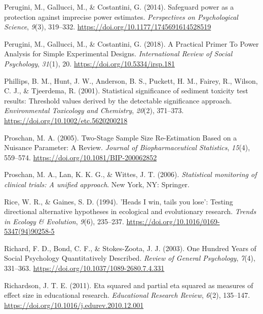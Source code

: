 \documentclass[
  english,
  ,jou, a4paper,floatsintext]{apa6}
\newlength{\cslhangindent}
\newenvironment{cslreferences}%
  {\setlength{\parindent}{0pt}%
  \everypar{\setlength{\hangindent}{\cslhangindent}}\ignorespaces}%
  {\par}
\begin{document}
\begin{cslreferences}
\leavevmode\hypertarget{ref-perugini_safeguard_2014}{}%
Perugini, M., Gallucci, M., \& Costantini, G. (2014). Safeguard power as a protection against imprecise power estimates. \emph{Perspectives on Psychological Science}, \emph{9}(3), 319--332. \url{https://doi.org/10.1177/1745691614528519}

\leavevmode\hypertarget{ref-perugini_practical_2018}{}%
Perugini, M., Gallucci, M., \& Costantini, G. (2018). A Practical Primer To Power Analysis for Simple Experimental Designs. \emph{International Review of Social Psychology}, \emph{31}(1), 20. \url{https://doi.org/10.5334/irsp.181}

\leavevmode\hypertarget{ref-phillips_statistical_2001}{}%
Phillips, B. M., Hunt, J. W., Anderson, B. S., Puckett, H. M., Fairey, R., Wilson, C. J., \& Tjeerdema, R. (2001). Statistical significance of sediment toxicity test results: Threshold values derived by the detectable significance approach. \emph{Environmental Toxicology and Chemistry}, \emph{20}(2), 371--373. \url{https://doi.org/10.1002/etc.5620200218}

\leavevmode\hypertarget{ref-proschan_two-stage_2005}{}%
Proschan, M. A. (2005). Two-Stage Sample Size Re-Estimation Based on a Nuisance Parameter: A Review. \emph{Journal of Biopharmaceutical Statistics}, \emph{15}(4), 559--574. \url{https://doi.org/10.1081/BIP-200062852}

\leavevmode\hypertarget{ref-proschan_statistical_2006}{}%
Proschan, M. A., Lan, K. K. G., \& Wittes, J. T. (2006). \emph{Statistical monitoring of clinical trials: A unified approach}. New York, NY: Springer.

\leavevmode\hypertarget{ref-rice_heads_1994}{}%
Rice, W. R., \& Gaines, S. D. (1994). 'Heads I win, tails you lose': Testing directional alternative hypotheses in ecological and evolutionary research. \emph{Trends in Ecology \& Evolution}, \emph{9}(6), 235--237. \url{https://doi.org/10.1016/0169-5347(94)90258-5}

\leavevmode\hypertarget{ref-richard_one_2003}{}%
Richard, F. D., Bond, C. F., \& Stokes-Zoota, J. J. (2003). One Hundred Years of Social Psychology Quantitatively Described. \emph{Review of General Psychology}, \emph{7}(4), 331--363. \url{https://doi.org/10.1037/1089-2680.7.4.331}

\leavevmode\hypertarget{ref-richardson_eta_2011}{}%
Richardson, J. T. E. (2011). Eta squared and partial eta squared as measures of effect size in educational research. \emph{Educational Research Review}, \emph{6}(2), 135--147. \url{https://doi.org/10.1016/j.edurev.2010.12.001}


\end{cslreferences}
\end{document}

